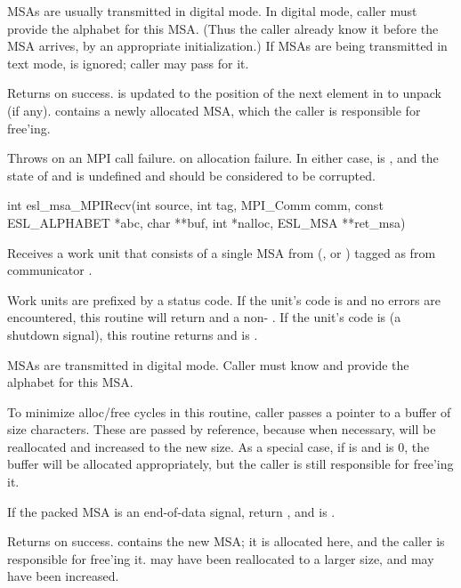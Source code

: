 \begin{sreapi}
MSAs are usually transmitted in digital mode. In digital
mode, caller must provide the alphabet  for this
MSA. (Thus the caller already know it before the MSA
arrives, by an appropriate initialization.) If MSAs are
being transmitted in text mode,  is ignored; caller
may pass  for it.

Returns  on success.  is updated to the position of
the next element in  to unpack (if any). 
contains a newly allocated MSA, which the caller is 
responsible for free'ing.

Throws  on an MPI call failure.  on allocation failure.
In either case,  is , and the state of 
and  is undefined and should be considered to be corrupted.



\hypertarget{func:esl_msa_MPIRecv()}
{\item[int esl\_msa\_MPIRecv(int source, int tag, MPI\_Comm comm, const ESL\_ALPHABET *abc, char **buf, int *nalloc, ESL\_MSA **ret\_msa)]}

Receives a work unit that consists of a single MSA from  (, or
) tagged as  from communicator .

Work units are prefixed by a status code. If the unit's
code is  and no errors are encountered, this
routine will return  and a non- .
If the unit's code is  (a shutdown signal), 
this routine returns  and  is .

MSAs are transmitted in digital mode. Caller must know and
provide the alphabet  for this MSA.

To minimize alloc/free cycles in this routine, caller
passes a pointer to a buffer  of size 
characters. These are passed by reference, because when
necessary,  will be reallocated and 
increased to the new size. As a special case, if 
is  and  is 0, the buffer will be
allocated appropriately, but the caller is still
responsible for free'ing it.

If the packed MSA is an end-of-data signal, return
, and  is .

Returns  on success.  contains the new MSA; it
is allocated here, and the caller is responsible for
free'ing it.   may have been reallocated to a
larger size, and  may have been increased.



\end{sreapi}
